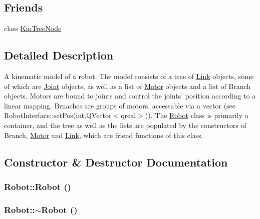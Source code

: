 \subsection*{Friends}
\begin{DoxyCompactItemize}
\item 
class \hyperlink{class_robot_model_1_1_robot_a2133a69fbecb2cd6583a1439af3ab61c}{KinTreeNode}
\end{DoxyCompactItemize}


\subsection{Detailed Description}
A kinematic model of a robot. The model consists of a tree of \hyperlink{class_robot_model_1_1_link}{Link} objects, some of which are \hyperlink{class_robot_model_1_1_joint}{Joint} objects, as well as a list of \hyperlink{class_robot_model_1_1_motor}{Motor} objects and a list of Branch objects. Motors are bound to joints and control the joints' position according to a linear mapping. Brnaches are groups of motors, accessable via a vector (see RobotInterface::setPos(int,QVector$<$qreal$>$)). The \hyperlink{class_robot_model_1_1_robot}{Robot} class is primarily a container, and the tree as well as the lists are populated by the constructors of Branch, \hyperlink{class_robot_model_1_1_motor}{Motor} and \hyperlink{class_robot_model_1_1_link}{Link}, which are friend functions of this class. 

\subsection{Constructor \& Destructor Documentation}
\hypertarget{class_robot_model_1_1_robot_a4fc7c70ae20623f05e06f2ecb388b6c4}{
\subsubsection[{Robot}]{\setlength{\rightskip}{0pt plus 5cm}Robot::Robot ()}}
\label{class_robot_model_1_1_robot_a4fc7c70ae20623f05e06f2ecb388b6c4}
\hypertarget{class_robot_model_1_1_robot_a924320124b09c2f2ac1621aa210d5f38}{
\subsubsection[{$\sim$Robot}]{\setlength{\rightskip}{0pt plus 5cm}Robot::$\sim$Robot ()}}
\label{class_robot_model_1_1_robot_a924320124b09c2f2ac1621aa210d5f38}


